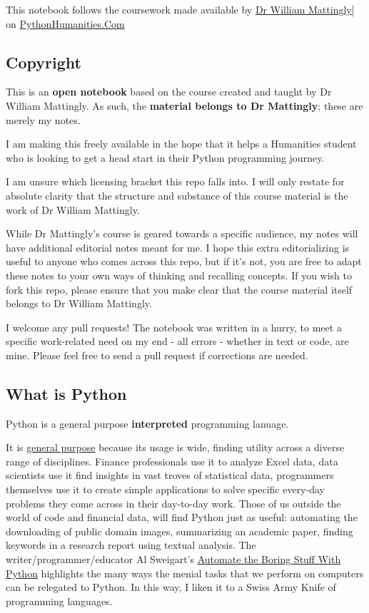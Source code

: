 \documentclass[11pt]{article}
\begin{document}
This notebook follows the coursework made available by \href{https://datascience.si.edu/people/dr-william-mattingly}{Dr William Mattingly}] on \href{https://pythonhumanities.com/}{PythonHumanities.Com}
\subsection{Copyright}
\label{sec:org9c58f23}
This is an \textbf{open notebook} based on the course created and taught by Dr William Mattingly. As such, the \textbf{material belongs to Dr Mattingly}; these are merely my notes.

I am making this freely available in the hope that it helps a Humanities student who is looking to get a head start in their Python programming journey.

I am unsure which licensing bracket this repo falls into. I will only restate for absolute clarity that the structure and substance of this course material is the work of Dr William Mattingly.

While Dr Mattingly's course is geared towards a specific audience, my notes will have additional editorial notes meant for me. I hope this extra editorializing is useful to anyone who comes across this repo, but if it's not, you are free to adapt these notes to your own ways of thinking and recalling concepts. If you wish to fork this repo, please ensure that you make clear that the course material itself belongs to Dr William Mattingly.

I welcome any pull requests! The notebook was written in a hurry, to meet a specific work-related need on my end - all errors - whether in text or code, are mine. Please feel free to send a pull request if corrections are needed.


\subsection{What is Python}
\label{sec:org83b6973}
Python is a general purpose \textbf{interpreted} programming lanuage.

It is \uline{general purpose} because its usage is wide, finding utility across a diverse range of disciplines. Finance professionals use it to analyze Excel data, data scientists use it find insights in vast troves of statistical data, programmers themselves use it to create simple applications to solve specific every-day problems they come across in their day-to-day work. Those of us outside the world of code and financial data, will find Python just as useful: automating the downloading of public domain images, summarizing an academic paper, finding keywords in a research report using textual analysis. The writer/programmer/educator Al Sweigart's \href{https://automatetheboringstuff.com/}{Automate the Boring Stuff With Python} highlights the many ways the menial tasks that we perform on computers can be relegated to Python. In this way, I liken it to a Swiss Army Knife of programming languages.
\end{document}
